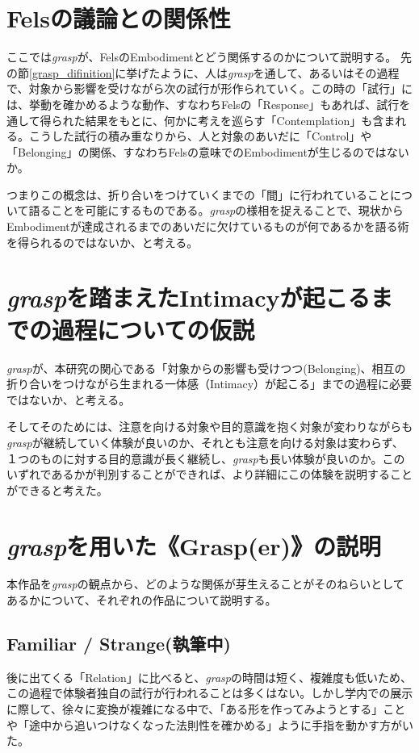 \section{Felsの議論との関係性}
ここでは\textit{grasp}が、FelsのEmbodimentとどう関係するのかについて説明する。
先の節\ref{grasp_difinition}に挙げたように、人は\textit{grasp}を通して、あるいはその過程で、対象から影響を受けながら次の試行が形作られていく。この時の「試行」には、挙動を確かめるような動作、すなわちFelsの「Response」もあれば、試行を通して得られた結果をもとに、何かに考えを巡らす「Contemplation」も含まれる。こうした試行の積み重なりから、人と対象のあいだに「Control」や「Belonging」の関係、すなわちFelsの意味でのEmbodimentが生じるのではないか。

つまりこの概念は、折り合いをつけていくまでの「間」に行われていることについて語ることを可能にするものである。\textit{grasp}の様相を捉えることで、現状からEmbodimentが達成されるまでのあいだに欠けているものが何であるかを語る術を得られるのではないか、と考える。

\section{\textit{grasp}を踏まえたIntimacyが起こるまでの過程についての仮説}
\textit{grasp}が、本研究の関心である「対象からの影響も受けつつ(Belonging)、相互の折り合いをつけながら生まれる一体感（Intimacy）が起こる」までの過程に必要ではないか、と考える。

そしてそのためには、注意を向ける対象や目的意識を抱く対象が変わりながらも\textit{grasp}が継続していく体験が良いのか、それとも注意を向ける対象は変わらず、１つのものに対する目的意識が長く継続し、\textit{grasp}も長い体験が良いのか。このいずれであるかが判別することができれば、より詳細にこの体験を説明することができると考えた。

\section{\textit{grasp}を用いた《Grasp(er)》の説明}
本作品を\textit{grasp}の観点から、どのような関係が芽生えることがそのねらいとしてあるかについて、それぞれの作品について説明する。

\subsection*{Familiar / Strange(執筆中)}
後に出てくる「Relation」に比べると、\textit{grasp}の時間は短く、複雑度も低いため、この過程で体験者独自の試行が行われることは多くはない。しかし学内での展示に際して、徐々に変換が複雑になる中で、「ある形を作ってみようとする」ことや「途中から追いつけなくなった法則性を確かめる」ように手指を動かす方がいた。

